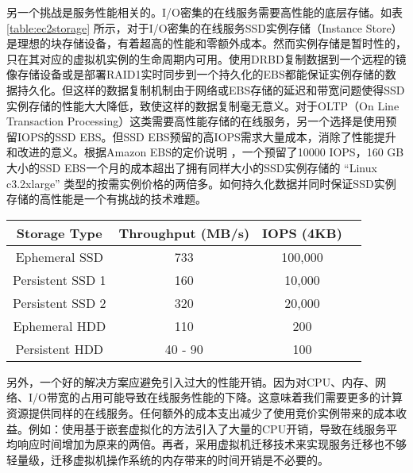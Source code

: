 另一个挑战是服务性能相关的。I/O密集的在线服务需要高性能的底层存储。如表 \ref{table:ec2storage} 所示，对于I/O密集的在线服务SSD实例存储（Instance Store）是理想的块存储设备，有着超高的性能和零额外成本。然而实例存储是暂时性的，只在其对应的虚拟机实例的生命周期内可用。使用DRBD复制数据到一个远程的镜像存储设备或是部署RAID1实时同步到一个持久化的EBS都能保证实例存储的数据持久化。但这样的数据复制机制由于网络或EBS存储的延迟和带宽问题使得SSD实例存储的性能大大降低，致使这样的数据复制毫无意义。对于OLTP（On Line Transaction Processing）这类需要高性能存储的在线服务，另一个选择是使用预留IOPS的SSD EBS。但SSD EBS预留的高IOPS需求大量成本，消除了性能提升和改进的意义。根据Amazon EBS的定价说明 \cite{EBSPricing:2015}，一个预留了10000 IOPS，160 GB 大小的SSD EBS一个月的成本超出了拥有同样大小的SSD实例存储的 ``Linux c3.2xlarge'' 类型的按需实例价格的两倍多。如何持久化数据并同时保证SSD实例存储的高性能是一个有挑战的技术难题。
\begin{table*}
\centering
\caption{Amazon EC2 Storage Performance Details}
\label{table:ec2storage}
\begin{tabular}{c|ccc} \hline
Storage Type& Throughput (MB/s)& IOPS (4KB)\\ \hline
Ephemeral SSD & 733 & 100,000\\ \hline
Persistent SSD 1 & 160 & 10,000\\ \hline
Persistent SSD 2 & 320 & 20,000\\ \hline
Ephemeral HDD & 110 & 200 \\ \hline
Persistent HDD & 40 - 90 & 100\\ \hline
\end{tabular}
\end{table*}

另外，一个好的解决方案应避免引入过大的性能开销。因为对CPU、内存、网络、I/O带宽的占用可能导致在线服务性能的下降。这意味着我们需要更多的计算资源提供同样的在线服务。任何额外的成本支出减少了使用竞价实例带来的成本收益。例如：使用基于嵌套虚拟化的方法引入了大量的CPU开销，导致在线服务平均响应时间增加为原来的两倍。再者，采用虚拟机迁移技术来实现服务迁移也不够轻量级，迁移虚拟机操作系统的内存带来的时间开销是不必要的。

